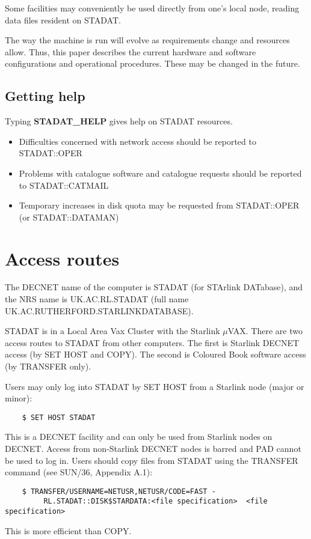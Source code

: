 Some facilities may conveniently be used directly from one's local node,
reading data files resident on STADAT.

The way the machine is run will evolve as requirements change and resources
allow.
Thus, this paper describes the current
hardware and software configurations
and operational procedures.
These may be changed in the future.


\subsection{Getting help}

Typing {\bf STADAT\_HELP} gives help on STADAT resources.
\begin{itemize}
\item Difficulties concerned with network
     access should be reported to STADAT::OPER
\item Problems with catalogue software and catalogue requests should be reported
      to STADAT::CATMAIL
\item Temporary increases in disk quota may be requested from STADAT::OPER
      (or STADAT::DATAMAN)
\end{itemize}

\section{Access routes}

The DECNET name of the computer is STADAT (for STArlink DATabase), and
the NRS name is UK.AC.RL.STADAT (full name
UK.AC.RUTHERFORD.STARLINKDATABASE).

STADAT is  in a Local Area Vax Cluster with the Starlink $\mu$VAX.
There are two access routes to STADAT from other computers.
The first is Starlink DECNET access (by SET HOST and COPY).
The second is Coloured Book software access (by TRANSFER only).

Users may only log into STADAT by SET HOST from a Starlink node
(major or minor):
\begin{verbatim}
    $ SET HOST STADAT
\end{verbatim}
This is a DECNET facility and can only be used from Starlink nodes on DECNET.
Access from non-Starlink DECNET nodes is barred and PAD cannot be used
to log in.
Users should copy files from STADAT using the TRANSFER command (see SUN/36,
Appendix A.1):
\begin{verbatim}
    $ TRANSFER/USERNAME=NETUSR,NETUSR/CODE=FAST -
         RL.STADAT::DISK$STARDATA:<file specification>  <file specification>
\end{verbatim}
This is more efficient than COPY.



